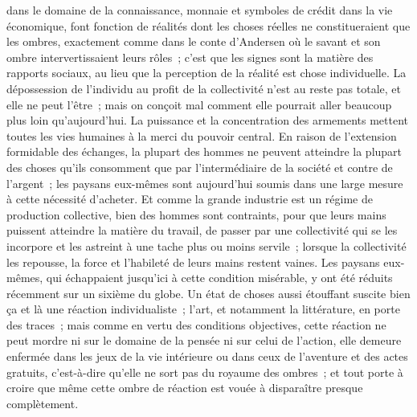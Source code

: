 \documentclass[french,twoside]{book} %
\begin{document}
dans le domaine de la connaissance, monnaie et symboles de crédit dans la vie économique, font fonction de réalités dont les choses réelles ne constitueraient que les ombres, exactement comme dans le conte d'Andersen où le savant et son ombre intervertissaient leurs rôles ; c'est que les signes sont la matière des rapports sociaux, au lieu que la perception de la réalité est chose individuelle. La dépossession de l'individu au profit de la collectivité n'est au reste pas totale, et elle ne peut l'être ; mais on conçoit mal comment elle pourrait aller beaucoup plus loin qu'aujourd'hui. La puissance et la concentration des armements mettent toutes les vies humaines à la merci du pouvoir central. En raison de l'extension formidable des échanges, la plupart des hommes ne peuvent atteindre la plupart des choses qu'ils consomment que par l'intermédiaire de la société et contre de l'argent ; les paysans eux-mêmes sont aujourd'hui soumis dans une large mesure à cette nécessité d'acheter. Et comme la grande industrie est un régime de production collective, bien des hommes sont contraints, pour que leurs mains puissent atteindre la matière du travail, de passer par une collectivité qui se les incorpore et les astreint à une tache plus ou moins servile ; lorsque la collectivité les repousse, la force et l'habileté de leurs mains restent vaines. Les paysans eux-mêmes, qui échappaient jusqu'ici à cette condition misérable, y ont été réduits récemment sur un sixième du globe. Un état de choses aussi étouffant suscite bien ça et là une réaction individualiste ; l'art, et notamment la littérature, en porte des traces ; mais comme en vertu des conditions objectives, cette réaction ne peut mordre ni sur le domaine de la pensée ni sur celui de l'action, elle demeure enfermée dans les jeux de la vie intérieure ou dans ceux de l'aventure et des actes gratuits, c'est-à-dire qu'elle ne sort pas du royaume des ombres ; et tout porte à croire que même cette ombre de réaction est vouée à disparaître presque complètement.\par
\end{document}
